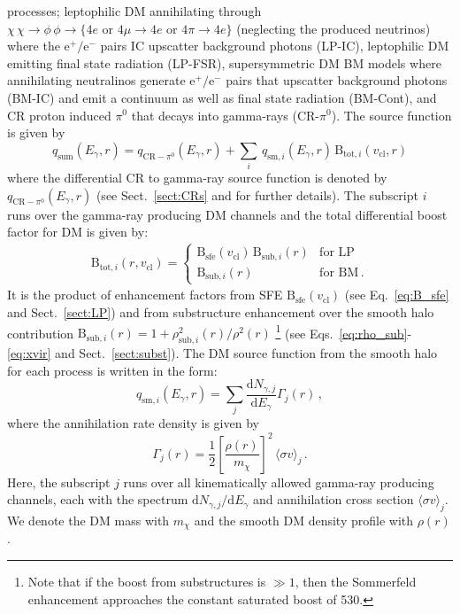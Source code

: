 \documentclass[10pt,aps,pra,reprint,amsmath,amsfonts,amssymb,showpacs,nofootinbib,floatfix]{revtex4-1}
\newcommand{\rmn}{\mathrm}
\newcommand{\sfe}{\rmn{sfe}}
\newcommand{\sub}{\rmn{sub}}
\newcommand{\B}{\rmn{B}}
\newcommand{\qCR}{q_{\rmn{CR}-\ensuremath{\pi^0}}}
\newcommand{\dd}{\rmn{d}}
\newcommand{\mx}{\ensuremath{m_{\chi}}}
\newcommand{\ngammaj}{\ensuremath{N_{\gamma,j}}}
\newcommand{\sigmaannv}{\ensuremath{\langle\sigma v\rangle}}
\newcommand{\sigv}{v_\rmn{cl}}
\newcommand{\egamma}{\ensuremath{E_{\gamma}}}
\newcommand{\eg}{E_\gamma}
\begin{document}
processes; leptophilic DM annihilating through
$\chi\,\chi\to\phi\,\phi\to\{4e\mbox{~or~}4\mu\to4e
\mbox{~or~}4\pi\to4e\}$ (neglecting the produced neutrinos) where the
$\rmn{e}^+/\rmn{e}^-$ pairs IC upscatter background photons (LP-IC),
leptophilic DM emitting final state radiation (LP-FSR), supersymmetric
DM BM models where annihilating neutralinos generate
$\rmn{e}^+/\rmn{e}^-$ pairs that upscatter background photons (BM-IC)
and emit a continuum as well as final state radiation (BM-Cont), and
CR proton induced $\pi^0$ that decays into gamma-rays
(CR-$\pi^0$). The source function is given by
\begin{equation}
q_\rmn{sum} (\eg,r) = \qCR(\eg,r)+
\sum_i \,q_{\rmn{sm},i}(\eg,r)\,\B_{\rmn{tot},i}(\sigv,r)
\end{equation}
where the differential CR to gamma-ray source function is denoted
by $\qCR(\eg,r)$ (see Sect.~\ref{sect:CRs} and
\cite{2010MNRAS.409..449P} for further details). The subscript $i$
runs over the gamma-ray producing DM channels and the total
differential boost factor for DM is given by:
\begin{eqnarray}
\B_{\rmn{tot},i}(r,\sigv) = \left\{\begin{array}{cc}
\B_\sfe(\sigv)\,\B_{\sub,i}(r) &\rmn{for\,\,LP}\\
\B_{\sub,i}(r) &\rmn{for\,\,BM\,.}\end{array}\right.
\end{eqnarray}
It is the product of enhancement factors from SFE $\B_\sfe(\sigv)$
(see Eq.~\ref{eq:B_sfe} and Sect.~\ref{sect:LP}) and from substructure
enhancement over the smooth halo contribution $\B_{\sub,i}(r) =
1+\rho_{\sub,i}^2(r)/\rho^2(r)$ \footnote{Note that if the boost
    from substructures is $\gg 1$, then the Sommerfeld enhancement
    approaches the constant saturated boost of 530.} (see
Eqs.~\ref{eq:rho_sub}-\ref{eq:xvir} and Sect.~\ref{sect:subst}). The
DM source function from the smooth halo for each process is written in
the form:
\begin{equation}
\label{eq:q_sm}
q_{\rmn{sm},i} (\egamma,r) = \sum_j
\frac{\dd \ngammaj}{\dd E_\gamma} \Gamma_j(r)\,,
\end{equation}
where the annihilation rate density is given by
\begin{equation}
\label{eq:ann_rate}
\Gamma_j(r) = \frac{1}{2} \left[\frac{\rho(r)}{\mx}\right]^2
\, \sigmaannv_j\,.
\end{equation}
Here, the subscript $j$ runs over all kinematically allowed gamma-ray
producing channels, each with the spectrum $\dd
  \ngammaj /\dd\eg$ and annihilation cross section $\sigmaannv_j$.
We denote the DM mass with $\mx$ and the smooth DM density profile
with $\rho(r)$.
\end{document}
